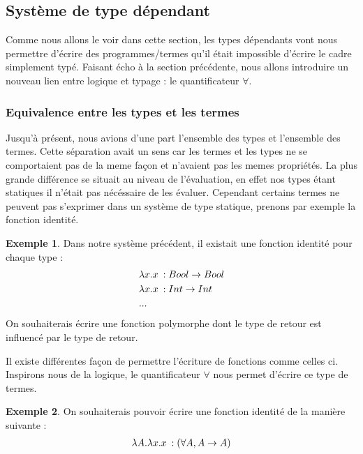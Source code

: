 \documentclass {article}
\theoremstyle{definition}
\newtheorem{example}{Exemple}
\theoremstyle{remark}
\begin{document}
\subsection{Système de type dépendant}

Comme nous allons le voir dans cette section, les types dépendants vont nous permettre d'écrire des programmes/termes qu'il était impossible d'écrire le cadre simplement typé. Faisant écho à la section précédente,
nous allons introduire un nouveau lien entre logique et typage : le quantificateur $\forall$.

\subsubsection{Equivalence entre les types et les termes}
\label{presentation_type_dependants}

Jusqu'à présent, nous avions d'une part l'ensemble des types et l'ensemble des termes. Cette séparation 
avait un sens car les termes et les types ne se comportaient pas de la meme façon et n'avaient pas les memes propriétés. 
La plus grande différence se situait au niveau de l'évaluation, en effet nos types étant statiques il n'était pas nécéssaire de les évaluer.
Cependant certains termes ne peuvent pas s'exprimer dans un système de type statique, prenons par exemple
la fonction identité. 
\begin{example}
  Dans notre système précédent, il existait une fonction identité pour chaque type :
  \begin{align*}
    &\lambda x. x\: :Bool\rightarrow Bool \\
    &\lambda x. x\: :Int\rightarrow Int \\
    & ... \\
  \end{align*}
On souhaiterais écrire une fonction polymorphe dont le type de retour est influencé par le type de retour.
\end{example}

Il existe différentes façon de permettre l'écriture de fonctions comme celles ci. Inspirons nous de la
logique, le quantificateur $\forall$ nous permet d'écrire ce type de termes.
\begin{example}
  On souhaiterais pouvoir écrire une fonction identité de la manière suivante :
  \begin{align*}
    \lambda A. \lambda x. x\::(\forall A, A \rightarrow A)
  \end{align*}
\end{example}
\end{document}

